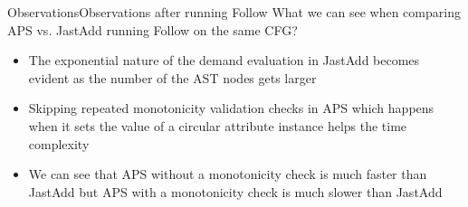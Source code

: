 \begin{frame}{Observations}{Observations after running Follow}
What we can see when comparing APS vs. JastAdd running Follow on the same CFG?

    \begin{itemize}
        \item The \alert{exponential nature of the demand evaluation} in JastAdd becomes evident as the number of the AST nodes gets larger
        \item \alert{Skipping repeated monotonicity validation checks} in APS which happens when it sets the value of a circular attribute instance helps the time complexity
        \item We can see that \alert{APS without a monotonicity check is much faster} than JastAdd but \alert{APS with a monotonicity check is much slower} than JastAdd
    \end{itemize}
\end{frame}

